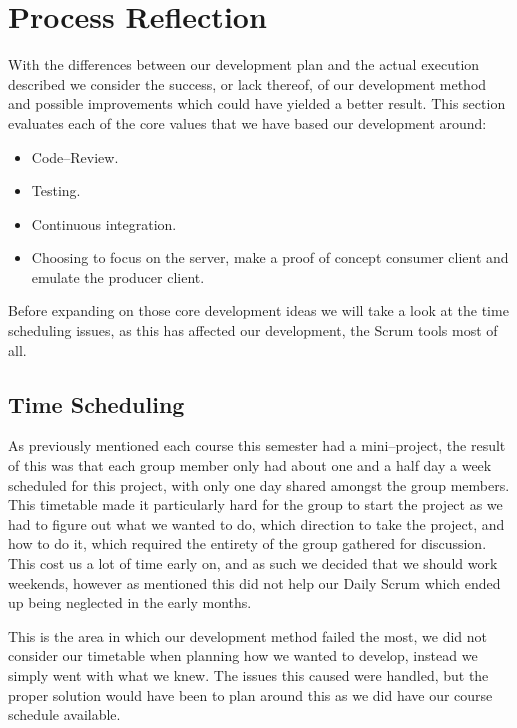 \section{Process Reflection}
With the differences between our development plan and the actual execution described we consider the success, or lack thereof, of our development method and possible improvements which could have yielded a better result.
This section evaluates each of the core values that we have based our development around:
\begin{itemize}
    \item Code--Review.
    \item Testing.
    \item Continuous integration.
    \item Choosing to focus on the server, make a proof of concept consumer client and emulate the producer client.
\end{itemize}
Before expanding on those core development ideas we will take a look at the time scheduling issues, as this has affected our development, the Scrum tools most of all.
\subsection{Time Scheduling}\label{sub:time_scheduling}
As previously mentioned each course this semester had a mini--project, the result of this was that each group member only had about one and a half day a week scheduled for this project, with only one day shared amongst the group members.
This timetable made it particularly hard for the group to start the project as we had to figure out what we wanted to do, which direction to take the project, and how to do it, which required the entirety of the group gathered for discussion.
This cost us a lot of time early on, and as such we decided that we should work weekends, however as mentioned this did not help our Daily Scrum which ended up being neglected in the early months.

This is the area in which our development method failed the most, we did not consider our timetable when planning how we wanted to develop, instead we simply went with what we knew.
The issues this caused were handled, but the proper solution would have been to plan around this as we did have our course schedule available.


